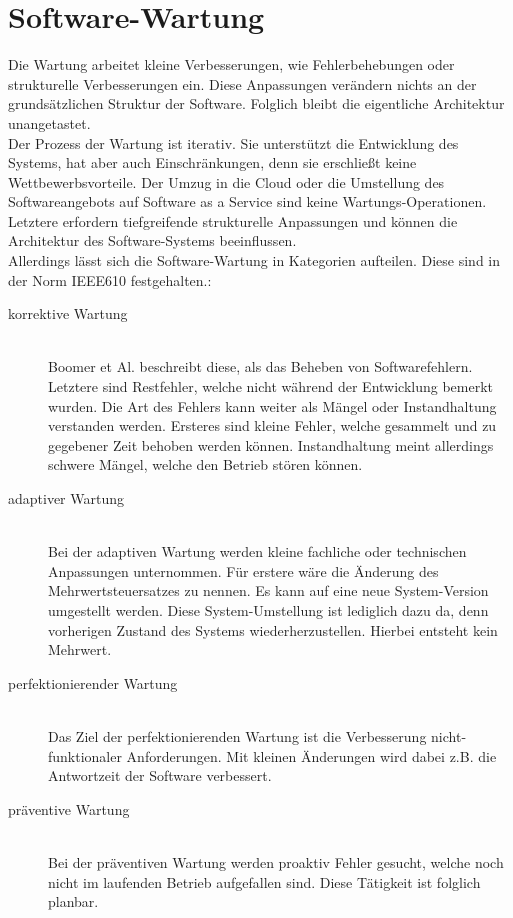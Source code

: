 \section{Software-Wartung}
Die Wartung arbeitet kleine Verbesserungen, wie Fehlerbehebungen oder strukturelle Verbesserungen ein. Diese Anpassungen verändern nichts an der grundsätzlichen Struktur der Software. Folglich bleibt die eigentliche Architektur unangetastet. \cite{seacord_modernizing_2003}\cite{bommer_softwarewartung_2016}\\
\newline
Der Prozess der Wartung ist iterativ. Sie unterstützt die Entwicklung des Systems, hat aber auch Einschränkungen, denn sie erschließt keine Wettbewerbsvorteile. \cite{seacord_modernizing_2003}
Der Umzug in die Cloud oder die Umstellung des Softwareangebots auf Software as a Service sind keine Wartungs-Operationen. Letztere erfordern tiefgreifende strukturelle Anpassungen und können die Architektur des Software-Systems beeinflussen.\\
Allerdings lässt sich die Software-Wartung in Kategorien aufteilen. Diese sind in der Norm IEEE610 festgehalten.:
\begin{description}
    \item [korrektive Wartung] \hfill \\ Boomer et Al. beschreibt diese, als das Beheben von Softwarefehlern. Letztere sind Restfehler, welche nicht während der Entwicklung bemerkt wurden. Die Art des Fehlers kann weiter als Mängel oder Instandhaltung verstanden werden. Ersteres sind kleine Fehler, welche gesammelt und zu gegebener Zeit behoben werden können. Instandhaltung meint allerdings schwere Mängel, welche den Betrieb stören können. \cite{bommer_softwarewartung_2016}
    \item [adaptiver Wartung] \hfill \\ Bei der adaptiven Wartung werden kleine fachliche oder technischen  Anpassungen unternommen. Für erstere wäre die Änderung des Mehrwertsteuersatzes zu nennen. Es kann auf eine neue System-Version umgestellt werden. Diese System-Umstellung ist lediglich dazu da, denn vorherigen Zustand des Systems wiederherzustellen. Hierbei entsteht kein Mehrwert. \cite{bommer_softwarewartung_2016}
    \item [perfektionierender Wartung] \hfill \\ Das Ziel der perfektionierenden Wartung ist die Verbesserung nicht-funktionaler Anforderungen. Mit kleinen Änderungen wird dabei z.B. die Antwortzeit der Software verbessert. \cite{bommer_softwarewartung_2016}
    \item [präventive Wartung] \hfill \\ Bei der präventiven Wartung werden proaktiv Fehler gesucht, welche noch nicht im laufenden Betrieb aufgefallen sind. Diese Tätigkeit ist folglich planbar. \cite{bommer_softwarewartung_2016}
\end{description}
